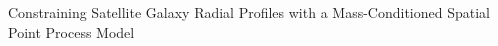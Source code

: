 \documentclass[]{article}
\begin{document}
Constraining Satellite Galaxy Radial Profiles with a Mass-Conditioned Spatial Point Process Model
\end{document}
